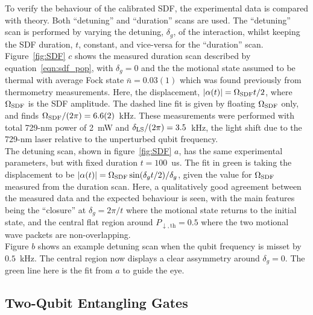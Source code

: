     To verify the behaviour of the calibrated SDF, the experimental data is compared with theory. Both
    ``detuning'' and ``duration'' scans are used. The ``detuning'' scan is performed by
    varying the detuning, $\delta_g$, of the interaction, whilst keeping the
    SDF duration, $t$, constant, and vice-versa for the ``duration'' scan. \\
    Figure~\ref{fig:SDF} $c$ shows the measured duration scan described by equation~\ref{eqn:sdf_pop}, with $\delta_g = 0$ and the the motional state assumed to be thermal with average Fock state $\bar{n}
    = 0.03(1)$ which was found previously from thermometry measurements.
    Here, the displacement, $|\alpha(t)| = \Omega_{\rm SDF} t/2$, where $\Omega_{\rm SDF}$ is the
    SDF amplitude. The dashed line fit is given by floating $\Omega_{\rm SDF}$ only, and finds $\Omega_{\rm SDF}/(2\pi) = 6.6(2)$~\unit{kHz}.
    These measurements were performed with total 729-nm power of 2~mW and $\delta_{\rm LS}/(2\pi) = 3.5$~\unit{\kHz}, the light shift due to the 729-nm laser relative to the unperturbed qubit frequency. \\
    The detuning scan, shown in figure~\ref{fig:SDF} $a$, has the same experimental parameters, but with fixed duration $t=100$~\unit{us}. The fit in green is taking the 
    displacement to be $|\alpha(t)| = \Omega_{\rm SDF} \sin(\delta_g t/2)/\delta_g$, given the value for $\Omega_{\rm SDF}$ measured from the duration scan. Here,
    a qualitatively good agreement between the measured data and the
    expected behaviour is seen, with the main features being the ``closure''
    at $\delta_g = 2\pi/t$ where the motional state returns to the initial state,
    and the central flat region around $P_{\downarrow, \mathrm{th}} =0.5$ where
    the two motional wave packets are non-overlapping.\\
    Figure $b$ shows an example detuning scan when the qubit frequency is misset by $0.5$~\unit{\kHz}. The central region now displays a clear assymmetry around $\delta_g = 0$. The green line here is the fit from $a$ to guide the eye.


\subsection{Two-Qubit Entangling Gates}
\label{sec:Two-Qubit Entangling Gates}

